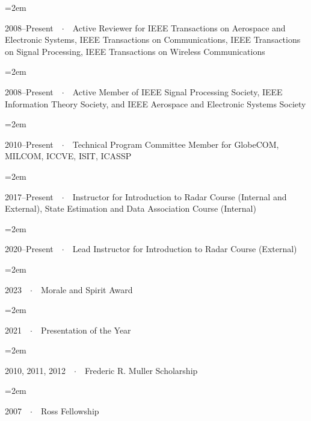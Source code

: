 \documentclass{scrartcl}
\newcommand{\MarginText}[1]{\marginpar{\raggedleft\itshape\small#1}} %
\newcommand{\Description}[1]{\hangindent=2em\hangafter=0\noindent\raggedright\footnotesize{#1}\par\normalsize\vspace{1em}} %
\begin{document}
\begin{cv}{}

\vspace{1em}

\Description{2008--Present\ \ $\cdotp$\ \ Active Reviewer for IEEE Transactions on Aerospace and Electronic Systems, IEEE Transactions on Communications, IEEE Transactions on Signal Processing, IEEE Transactions on Wireless Communications}

\Description{2008--Present\ \ $\cdotp$\ \ Active Member of IEEE Signal Processing Society, IEEE Information Theory Society, and IEEE Aerospace and Electronic Systems Society}

\Description{2010--Present\ \ $\cdotp$\ \ Technical Program Committee Member for GlobeCOM, MILCOM, ICCVE, ISIT, ICASSP}

\Description{2017--Present\ \ $\cdotp$\ \ Instructor for Introduction to Radar Course (Internal and External), State Estimation and Data Association Course (Internal)}

\Description{2020--Present\ \ $\cdotp$\ \ Lead Instructor for Introduction to Radar Course (External)}

\vspace{1em} %

\vspace{1em}

\Description{\MarginText{Awards}2023\ \ $\cdotp$\ \ Morale and Spirit Award}

\vspace{-0.5em}

\Description{2021\ \ $\cdotp$\ \ Presentation of the Year}

\vspace{-0.5em}

\Description{2010, 2011, 2012\ \ $\cdotp$\ \ Frederic R. Muller Scholarship}

\vspace{-0.5em} %

\Description{2007\ \ $\cdotp$\ \ Ross Fellowship}

\vspace{-0.5em} %


\end{cv}
\end{document}
